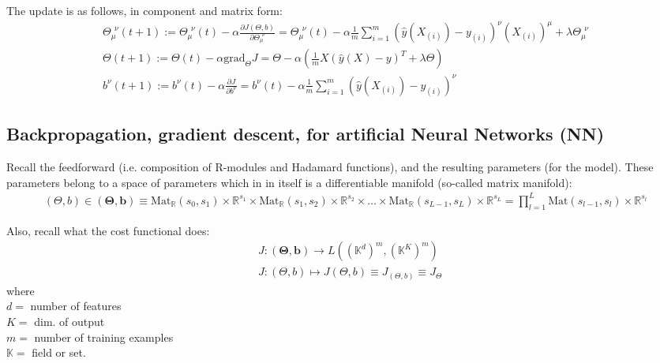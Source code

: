 \documentclass[10pt]{amsart}
\begin{document}
\begin{multicols*}{2}
The update is as follows, in component and matrix form:
\begin{equation}
\begin{gathered}
\Theta_{\mu}^{\  \  \nu}(t+1) := \Theta_{\mu}^{\  \  \nu}(t) - \alpha \frac{ \partial J( \Theta,b) }{ \partial \Theta_{\mu}^{\  \  \nu}}  = \Theta_{\mu}^{\  \  \nu}(t) - \alpha \frac{1}{m} \sum_{i=1}^m (\widehat{y}(X_{(i)}) - y_{(i)})^{\nu} (X_{(i)})^{\mu} + \lambda \Theta_{\mu}^{\  \  \nu} \\
\Theta(t+1) := \Theta(t) -\alpha \text{grad}_{\Theta}J = \Theta - \alpha \left( \frac{1}{m} X(\widehat{y}(X)-y)^T + \lambda \Theta \right) \\
b^{\nu}(t+1) := b^{\nu}(t) - \alpha \frac{ \partial J }{ \partial b^{\nu}} = b^{\nu}(t) - \alpha \frac{1}{m} \sum_{i=1}^m (\widehat{y}(X_{(i)}) - y_{(i)})^{\nu} 
\end{gathered}
\end{equation}

\subsection{Backpropagation, gradient descent, for artificial Neural Networks (NN)}
Recall the feedforward (i.e. composition of R-modules and Hadamard functions), and the resulting parameters (for the model).  These parameters belong to a space of parameters which in in itself is a differentiable manifold (so-called matrix manifold):  
\begin{equation}
\begin{gathered}
(\Theta,b) \in (\mathbf{\Theta},\mathbf{b}) \equiv \text{Mat}_{\mathbb{R}}(s_0,s_1) \times \mathbb{R}^{s_1} \times \text{Mat}_{\mathbb{R}}(s_1,s_2) \times \mathbb{R}^{s_2} \times \dots \times \text{Mat}_{\mathbb{R}}(s_{L-1},s_L) \times \mathbb{R}^{s_L} = \prod_{l=1}^L \text{Mat}(s_{l-1},s_l)\times \mathbb{R}^{s_l}  
\end{gathered}
\end{equation}
 
Also, recall what the cost functional does: 
\begin{equation}
\begin{aligned} 
& J:(\mathbf{\Theta}, \mathbf{b}) \to L((\mathbb{K}^d)^m,(\mathbb{K}^K)^m)   \\
& J:(\Theta,b) \mapsto J(\Theta,b) \equiv J_{(\Theta,b)} \equiv J_{\Theta}
\end{aligned}
\end{equation}
where \\
$d = $ number of features \\
$K=$ dim. of output \\
$m=$ number of training examples \\
$\mathbb{K} =$ field or set.  




\end{multicols*}
\end{document}
